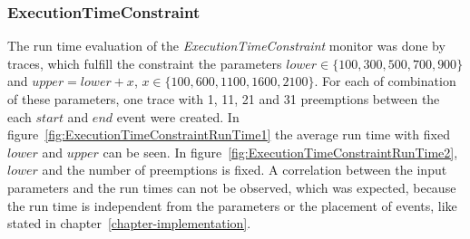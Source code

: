 \subsubsection{ExecutionTimeConstraint}
	The run time evaluation of the \textit{ExecutionTimeConstraint} monitor was done by traces, which fulfill the constraint the parameters $lower\in\{100,300,500,700,900\}$ and $upper=lower+x$, $x\in\{100,600,1100,1600,2100\}$. For each of combination of these parameters, one trace with 1, 11, 21 and 31 preemptions between the each $start$ and $end$ event were created. In figure~\ref{fig:ExecutionTimeConstraintRunTime1} the average run time with fixed $lower$ and $upper$ can be seen. In figure~\ref{fig:ExecutionTimeConstraintRunTime2}, $lower$ and the number of preemptions is fixed. A correlation between the input parameters and the run times can not be observed, which was expected, because the run time is independent from the parameters or the placement of events, like stated in chapter~\ref{chapter-implementation}.
